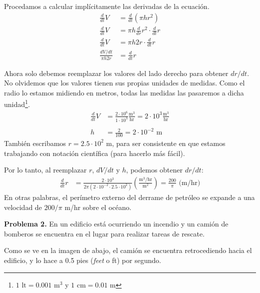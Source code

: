 \documentclass[12pt]{article}
\begin{document}
Procedamos a calcular implícitamente las derivadas de la ecuación.
\begin{align*}
	\frac{d}{dt}V &= \frac{d}{dt}(\pi h r^{2}) \\
	\frac{d}{dt}V &= \pi h \frac{d}{dr} r^{2} \cdot \frac{d}{dt} r \\
	\frac{d}{dt}V &= \pi h 2r \cdot \frac{d}{dt} r \\
	\frac{dV/dt}{\pi h 2r} &= \frac{d}{dt} r
\end{align*}

\newpage

Ahora solo debemos reemplazar los valores del lado derecho para obtener $dr/dt$. No olvidemos que los valores tienen sus propias unidades de medidas. Como el radio lo estamos midiendo en metros, todas las medidas las pasaremos a dicha unidad\footnote{$1 \text{ lt} = 0.001 \text{ m}^{3}$ y $1 \text{ cm} = 0.01 \text{ m}$}.
\begin{align*}
\frac{d}{dt}V &= \frac{2 \cdot 10^{6}}{1 \cdot 10^{3}}
				 \frac{\text{m}^{3}}{\text{hr}} 
		       = 2 \cdot 10^{3} \frac{\text{m}^{3}}{\text{hr}} \\ \\
h &= \frac{2}{100} = 2 \cdot 10^{-2} \text{ m}
\end{align*}
También escribamos $r = 2.5 \cdot 10^{2}$ m, para ser consistente en que estamos trabajando con notación científica (para hacerlo más fácil).

Por lo tanto, al reemplazar $r$, $dV/dt$ y $h$, podemos obtener $dr/dt$:
\begin{align*}
\frac{d}{dt} r &= \frac{2 \cdot 10^{3}}{
					    2 \pi (
					      2 \cdot 10^{-2} \cdot 2.5 \cdot 10^{2}
					    )
					   }
				  \left(
				    \frac{\text{m}^{3}/\text{hr}}{\text{m}^{2}}
				  \right)
               = \frac{200}{\pi} \text{ (m/hr)}
\end{align*}
En otras palabras, el perímetro externo del derrame de petróleo se expande a una velocidad de $200/\pi$ m/hr sobre el océano.


\textbf{Problema 2.} \quad En un edificio está ocurriendo un incendio y un camión de bomberos se encuentra en el lugar para realizar tareas de rescate.

Como se ve en la imagen de abajo, el camión se encuentra retrocediendo hacia el edificio, y lo hace a 0.5 pies (\textit{feet} o ft) por segundo.
\end{document}
